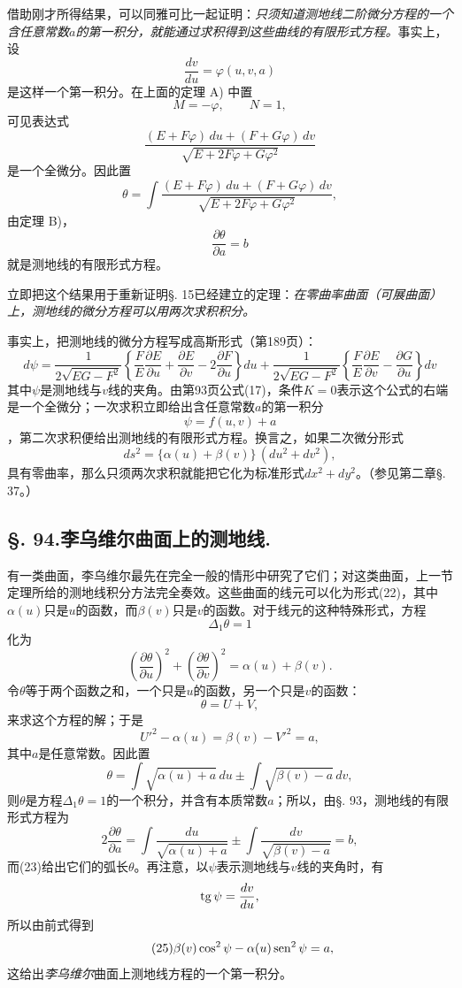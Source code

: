 借助刚才所得结果，可以同雅可比一起证明：\emph{只须知道测地线二阶微分方程的一个含任意常数\(a\)的第一积分，就能通过求积得到这些曲线的有限形式方程。}事实上，设
\[
 \frac{dv}{du}=\varphi(u,v,a)
\]
是这样一个第一积分。在上面的定理 A) 中置
\[
 M=-\varphi,\qquad N=1,
\]
可见表达式
\[
 \frac{(E+F\varphi)\,du+(F+G\varphi)\,dv}{\sqrt{E+2F\varphi+G\varphi^2}}
\]
是一个全微分。因此置
\[
 \theta=\int \frac{(E+F\varphi)\,du+(F+G\varphi)\,dv}{\sqrt{E+2F\varphi+G\varphi^2}},
\]
由定理 B)，
\[
 \frac{\partial\theta}{\partial a}=b
\]
就是测地线的有限形式方程。

立即把这个结果用于重新证明\S. 15已经建立的定理：\emph{在零曲率曲面（可展曲面）上，测地线的微分方程可以用两次求积积分。}

事实上，把测地线的微分方程写成高斯形式（第189页）：
\[
 d\psi=\frac{1}{2\sqrt{EG-F^2}}\left\{\frac{F}{E}\frac{\partial E}{\partial u}+\frac{\partial E}{\partial v}-2\frac{\partial F}{\partial u}\right\}du
 +\frac{1}{2\sqrt{EG-F^2}}\left\{\frac{F}{E}\frac{\partial E}{\partial v}-\frac{\partial G}{\partial u}\right\}dv
\]
其中\(\psi\)是测地线与\(v\)线的夹角。由第93页公式(17)，条件\(K=0\)表示这个公式的右端是一个全微分；一次求积立即给出含任意常数\(a\)的第一积分
\[
 \psi=f(u,v)+a
\]
，第二次求积便给出测地线的有限形式方程。换言之，如果二次微分形式
\begin{equation}\tag{22}
 ds^2=\{\alpha(u)+\beta(v)\}\,(du^2+dv^2),
\end{equation}
具有零曲率，那么只须两次求积就能把它化为标准形式\(dx^2+dy^2\)。（参见第二章\S. 37。）

\subsection*{\S. 94.\quad 李乌维尔曲面上的测地线.}

有一类曲面，李乌维尔最先在完全一般的情形中研究了它们；对这类曲面，上一节定理所给的测地线积分方法完全奏效。这些曲面的线元可以化为形式(22)，其中\(\alpha(u)\)只是\(u\)的函数，而\(\beta(v)\)只是\(v\)的函数。对于线元的这种特殊形式，方程
\[
 \Delta_1\theta=1
\]
化为
\[
 \left(\frac{\partial\theta}{\partial u}\right)^2+\left(\frac{\partial\theta}{\partial v}\right)^2=\alpha(u)+\beta(v).
\]
令\(\theta\)等于两个函数之和，一个只是\(u\)的函数，另一个只是\(v\)的函数：
\[
 \theta=U+V,
\]
来求这个方程的解；于是
\[
 U'^2-\alpha(u)=\beta(v)-V'^2=a,
\]
其中\(a\)是任意常数。因此置
\begin{equation}\tag{23}
 \theta=\int\sqrt{\alpha(u)+a}\,du \pm \int\sqrt{\beta(v)-a}\,dv,
\end{equation}
则\(\theta\)是方程\(\Delta_1\theta=1\)的一个积分，并含有本质常数\(a\)；所以，由\S. 93，测地线的有限形式方程为
\begin{equation}\tag{24}
 2\frac{\partial\theta}{\partial a}=\int\frac{du}{\sqrt{\alpha(u)+a}}\pm\int\frac{dv}{\sqrt{\beta(v)-a}}=b,
\end{equation}
而(23)给出它们的弧长\(\theta\)。再注意，以\(\psi\)表示测地线与\(v\)线的夹角时，有
\[
 \operatorname{tg}\psi=\frac{dv}{du},
\]
所以由前式得到
\begin{equation}\tag{25}
 \beta(v)\cos^2\psi-\alpha(u)\operatorname{sen}^2\psi=a,
\end{equation}
这给出\emph{李乌维尔}曲面上测地线方程的一个第一积分。

